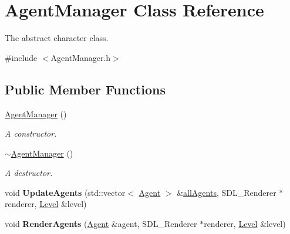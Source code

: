 \hypertarget{class_agent_manager}{}\section{Agent\+Manager Class Reference}
\label{class_agent_manager}


The abstract character class.  




{\ttfamily \#include $<$Agent\+Manager.\+h$>$}

\subsection*{Public Member Functions}
\begin{DoxyCompactItemize}
\item 
\mbox{\label{class_agent_manager_a49ff5a8f60bae1c0b8d6c9aeda8f6961}} 
\hyperlink{class_agent_manager_a49ff5a8f60bae1c0b8d6c9aeda8f6961}{Agent\+Manager} ()
\begin{DoxyCompactList}\small\item\em A constructor. \end{DoxyCompactList}\item 
\mbox{\label{class_agent_manager_a6b3efb95b74c9c96b9dbaf0868f17759}} 
\hyperlink{class_agent_manager_a6b3efb95b74c9c96b9dbaf0868f17759}{$\sim$\+Agent\+Manager} ()
\begin{DoxyCompactList}\small\item\em A destructor. \end{DoxyCompactList}\item 
\mbox{\label{class_agent_manager_aeb29779b8f17a2a4b0583ba45ec88e21}} 
void {\bfseries Update\+Agents} (std\+::vector$<$ \hyperlink{class_agent}{Agent} $>$ \&\hyperlink{class_agent_manager_a599aa8ac7b9ac078c77b493278d2b6da}{all\+Agents}, S\+D\+L\+\_\+\+Renderer $\ast$renderer, \hyperlink{class_level}{Level} \&level)
\item 
\mbox{\label{class_agent_manager_a23fa29fff7f4ce6e01b4c4cd1757be6a}} 
void {\bfseries Render\+Agents} (\hyperlink{class_agent}{Agent} \&agent, S\+D\+L\+\_\+\+Renderer $\ast$renderer, \hyperlink{class_level}{Level} \&level)
\item 
\mbox{\label{class_agent_manager_a67b4e05ac1f86c7cb3cf5d5ea0573b91}} 

\end{DoxyCompactItemize}
